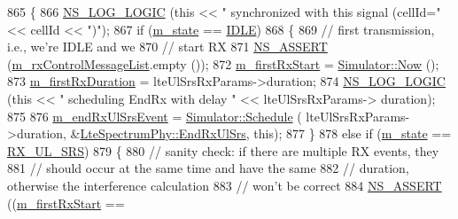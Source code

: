 \begin{DoxyCode}
865           \{
866             \hyperlink{group__logging_ga88acd260151caf2db9c0fc84997f45ce}{NS\_LOG\_LOGIC} (\textcolor{keyword}{this} << \textcolor{stringliteral}{" synchronized with this signal (cellId="} << cellId << \textcolor{stringliteral}{")"});
867             \textcolor{keywordflow}{if} (\hyperlink{classns3_1_1LteSpectrumPhy_a985b6688f1bbfcd8703096040b5c9b10}{m\_state} == \hyperlink{classns3_1_1LteSpectrumPhy_a52ce2cf9b4846807449c50399f6b8000a2e09524021e98183b06be8afd923a4c2}{IDLE})
868               \{
869                 \textcolor{comment}{// first transmission, i.e., we're IDLE and we}
870                 \textcolor{comment}{// start RX}
871                 \hyperlink{assert_8h_a6dccdb0de9b252f60088ce281c49d052}{NS\_ASSERT} (\hyperlink{classns3_1_1LteSpectrumPhy_ad0e520fb4b440e47e9d2b17b3c5fd05d}{m\_rxControlMessageList}.empty ());
872                 \hyperlink{classns3_1_1LteSpectrumPhy_a6b6c77a9ac1262136b08bcd88eb5c82e}{m\_firstRxStart} = \hyperlink{classns3_1_1Simulator_ac3178fa975b419f7875e7105be122800}{Simulator::Now} ();
873                 \hyperlink{classns3_1_1LteSpectrumPhy_a9dbb2b47df4bfc5d78bff2ed21a4cad8}{m\_firstRxDuration} = lteUlSrsRxParams->duration;
874                 \hyperlink{group__logging_ga88acd260151caf2db9c0fc84997f45ce}{NS\_LOG\_LOGIC} (\textcolor{keyword}{this} << \textcolor{stringliteral}{" scheduling EndRx with delay "} << lteUlSrsRxParams->
      duration);
875 
876                 \hyperlink{classns3_1_1LteSpectrumPhy_afa9f10d56316613e42a208f38b2d29bf}{m\_endRxUlSrsEvent} = \hyperlink{classns3_1_1Simulator_a671882c894a08af4a5e91181bf1eec13}{Simulator::Schedule} (
      lteUlSrsRxParams->duration, &\hyperlink{classns3_1_1LteSpectrumPhy_a71a205152af503902cd05d2f31f55227}{LteSpectrumPhy::EndRxUlSrs}, \textcolor{keyword}{this});
877               \}
878             \textcolor{keywordflow}{else} \textcolor{keywordflow}{if} (\hyperlink{classns3_1_1LteSpectrumPhy_a985b6688f1bbfcd8703096040b5c9b10}{m\_state} == \hyperlink{classns3_1_1LteSpectrumPhy_a52ce2cf9b4846807449c50399f6b8000aafc3f752bdb8472fa1a379757ce8a09f}{RX\_UL\_SRS})
879               \{
880                 \textcolor{comment}{// sanity check: if there are multiple RX events, they}
881                 \textcolor{comment}{// should occur at the same time and have the same}
882                 \textcolor{comment}{// duration, otherwise the interference calculation}
883                 \textcolor{comment}{// won't be correct}
884                 \hyperlink{assert_8h_a6dccdb0de9b252f60088ce281c49d052}{NS\_ASSERT} ((\hyperlink{classns3_1_1LteSpectrumPhy_a6b6c77a9ac1262136b08bcd88eb5c82e}{m\_firstRxStart} == 

\end{DoxyCode}
